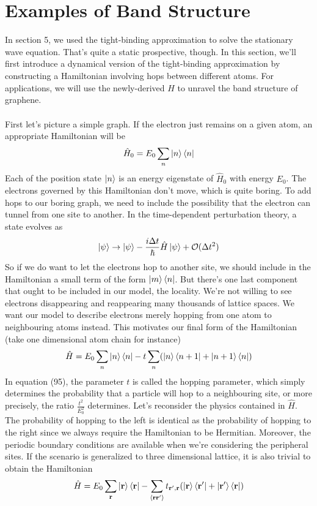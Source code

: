 \documentclass{article}
\begin{document}
\section{Examples of Band Structure}
In section 5, we used the tight-binding approximation to solve the stationary wave equation. That's quite a static prospective, though. In this section, we'll first introduce a dynamical version of the tight-binding approximation by constructing a Hamiltonian involving hops between different atoms. For applications, we will use the newly-derived $\hat{H}$ to unravel the band structure of graphene.\\
\\
First let's picture a simple graph. If the electron just remains on a given atom, an appropriate Hamiltonian will be\begin{equation}
    \hat{H}_0=E_0\sum_{n}\ket{n}\bra{n}
\end{equation}
Each of the position state $\ket{n}$ is an energy eigenstate of $\hat{H}_0$ with energy $E_0$. The electrons governed by this Hamiltonian don't move, which is quite boring. To add hops to our boring graph, we need to include the possibility that the electron can tunnel from one site to another. In the time-dependent perturbation theory, a state evolves as\begin{equation}
    \ket\psi\rightarrow\ket\psi-\frac{i\Delta{t}}{\hbar}\hat{H}\ket\psi+\mathcal{O}(\Delta{t}^2)
\end{equation}
So if we do want to let the electrons hop to another site, we should include in the Hamiltonian a small term of the form $\ket{m}\bra{n}$. But there's one last component that ought to be included in our model, the locality. We're not willing to see electrons disappearing and reappearing many thousands of lattice spaces. We want our model to describe electrons merely hopping from one atom to neighbouring atoms instead. This motivates our final form of the Hamiltonian (take one dimensional atom chain for instance)\begin{equation}
    \hat{H}=E_0\sum_n\ket{n}\bra{n}-t\sum_n(\ket{n}\bra{n+1}+\ket{n+1}\bra{n})
\end{equation}
In equation (95), the parameter $t$ is called the hopping parameter, which simply determines the probability that a particle will hop to a neighbouring site, or more precisely, the ratio $\frac{t^2}{E_0^2}$ determines. Let's reconsider the physics contained in $\hat{H}$. The probability of hopping to the left is identical as the probability of hopping to the right since we always require the Hamiltonian to be Hermitian. Moreover, the periodic boundary conditions are available when we're considering the peripheral sites. If the scenario is generalized to three dimensional lattice, it is also trivial to obtain the Hamiltonian\begin{equation}
    \hat{H}=E_0\sum_{\mathbf{r}}\ket{\mathbf{r}}\bra{\mathbf{r}}-\sum_{\langle{\mathbf{r}\mathbf{r}'}\rangle}t_{\mathbf{r}',\mathbf{r}}(\ket{\mathbf{r}}\bra{\mathbf{r}'}+\ket{\mathbf{r}'}\bra{\mathbf{r}})
\end{equation}
\end{document}
